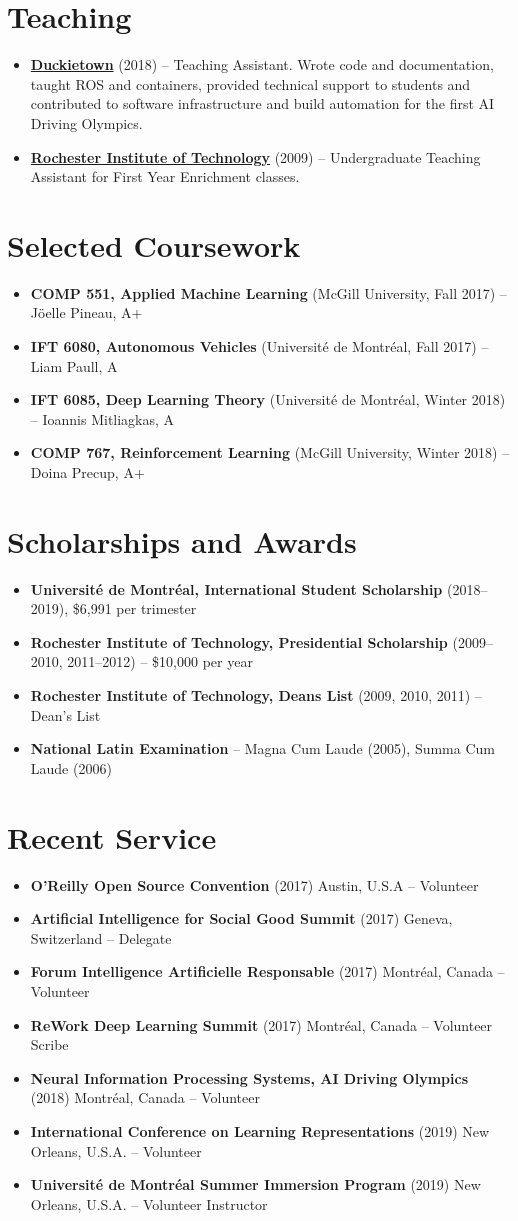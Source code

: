 \documentclass[letterpaper,11pt]{article}
\newcommand{\resumeItem}[2]{
\item\small{
\textbf{#1}{ #2 \vspace{-2pt}}
}
}
\newcommand{\resumeSubItem}[2]{\resumeItem{#1}{#2}}
\newcommand{\resumeSubHeadingListStart}{\begin{itemize}[leftmargin=*]}
\newcommand{\resumeSubHeadingListEnd}{\end{itemize}}
\begin{document}
\begin{justify}
\section{Teaching}
\resumeSubHeadingListStart
\resumeSubItem{\href{http://duckietown.org/}{Duckietown}}{(2018) -- Teaching Assistant. Wrote code and documentation, taught ROS and containers, provided technical support to students and contributed to software infrastructure and build automation for the first AI Driving Olympics.}
\resumeSubItem{\href{http://duckietown.org/}{Rochester Institute of Technology}}{(2009) -- Undergraduate Teaching Assistant for First Year Enrichment classes.}
\resumeSubHeadingListEnd

\section{Selected Coursework}
\resumeSubHeadingListStart
\resumeSubItem{COMP 551, Applied Machine Learning}{(McGill University, Fall 2017) -- J\"oelle Pineau, A+}
\resumeSubItem{IFT 6080, Autonomous Vehicles}{(Universit\'e de Montr\'eal, Fall 2017) -- Liam Paull, A}
\resumeSubItem{IFT 6085, Deep Learning Theory}{(Universit\'e de Montr\'eal, Winter 2018) -- Ioannis Mitliagkas, A}
\resumeSubItem{COMP 767, Reinforcement Learning}{(McGill University, Winter 2018) -- Doina Precup, A+}
\resumeSubHeadingListEnd

\section{Scholarships and Awards}
\resumeSubHeadingListStart
\resumeSubItem{Universit\'e de Montr\'eal, International Student Scholarship}{(2018--2019), \$6,991 per trimester}
\resumeSubItem{Rochester Institute of Technology, Presidential Scholarship}{(2009--2010, 2011--2012) -- \$10,000 per year}
\resumeSubItem{Rochester Institute of Technology, Deans List}{(2009, 2010, 2011) -- Dean's List}
\resumeSubItem{National Latin Examination}{-- Magna Cum Laude (2005), Summa Cum Laude (2006)}
\resumeSubHeadingListEnd

\section{Recent Service}
\resumeSubHeadingListStart
\resumeSubItem{O'Reilly Open Source Convention}{(2017) Austin, U.S.A -- Volunteer}
\resumeSubItem{Artificial Intelligence for Social Good Summit}{(2017) Geneva, Switzerland -- Delegate}
\resumeSubItem{Forum Intelligence Artificielle Responsable}{(2017) Montr\'eal, Canada -- Volunteer}
\resumeSubItem{ReWork Deep Learning Summit}{(2017) Montr\'eal, Canada -- Volunteer Scribe}
\resumeSubItem{Neural Information Processing Systems, AI Driving Olympics}{(2018) Montr\'eal, Canada -- Volunteer}
\resumeSubItem{International Conference on Learning Representations}{(2019) New Orleans, U.S.A. -- Volunteer}
\resumeSubItem{Universit\'e de Montr\'eal Summer Immersion Program}{(2019) New Orleans, U.S.A. -- Volunteer Instructor}
\resumeSubHeadingListEnd



\end{justify}
\end{document}

